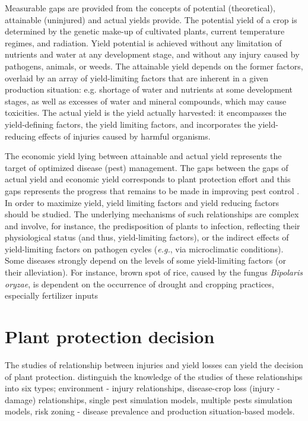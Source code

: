 Measurable gaps are provided from the concepts of potential (theoretical), attainable (uninjured) and actual yields provide. The potential yield of a crop is determined by the genetic make-up of cultivated plants, current temperature regimes, and radiation. Yield potential is achieved without any limitation of nutrients and water at any development stage, and without any injury caused by pathogens, animals, or weeds. The attainable yield depends on the former factors, overlaid by an array of yield-limiting factors that are inherent in a given production situation: e.g. shortage of water and nutrients at some development stages, as well as excesses of water and mineral compounds, which may cause toxicities. The actual yield is the yield actually harvested: it encompasses the yield-defining factors, the yield limiting factors, and incorporates the yield-reducing effects of injuries caused by harmful organisms. 

The economic yield lying between attainable and actual yield represents the target of optimized disease (pest) management. The gaps between the gaps of actual yield and economic yield corresponds to plant protection effort and this gaps represents the progress that remains to be made in improving pest control \cite{OERKE:2006ct}. In order to maximize yield, yield limiting factors and yield reducing factors should be studied. The underlying mechanisms of such relationships are complex \cite{Zadoks:1979ts} and involve, for instance, the predisposition of plants to infection, reflecting their physiological status (and thus, yield-limiting factors), or the indirect effects of yield-limiting factors on pathogen cycles (\textit{e.g.}, via microclimatic conditions). Some diseases strongly depend on the levels of some yield-limiting factors (or their alleviation). For instance, brown spot of rice, caused by the fungus \textit{Bipolaris oryzae}, is dependent on the occurrence of drought and cropping practices, especially fertilizer inputs \cite{barnwal2013review}

\section*{Plant protection decision}

The studies of relationship between injuries and yield losses can yield the decision of plant protection. \cite{Savary:2006to} distinguish the knowledge of the studies of these relationships into six types; environment - injury relationships, disease-crop loss (injury - damage) relationships, single pest simulation models, multiple pests simulation models, risk zoning - disease prevalence and production situation-based models.

